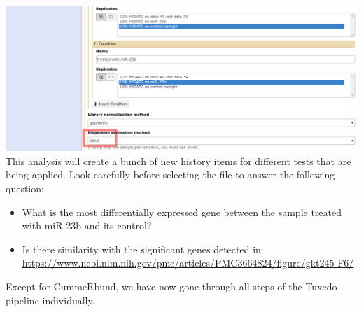\includegraphics[width=\textwidth]{figures/basic_04b.png}\\
This analysis will create a bunch of new history items for different tests that are being applied. Look carefully before selecting the file to answer the following question:
\begin{itemize}
	\item What is the most differentially expressed gene between the sample treated with miR-23b and its control?
	\item Is there similarity with the significant genes detected in:\\\url{https://www.ncbi.nlm.nih.gov/pmc/articles/PMC3664824/figure/gkt245-F6/}
\end{itemize}
Except for CummeRbund, we have now gone through all steps of the Tuxedo pipeline individually.
